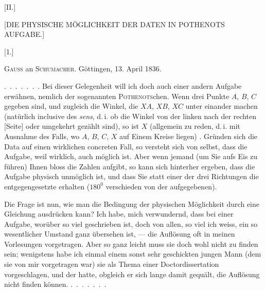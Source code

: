 \clearpage{}

\begin{center}
[II.]

[DIE PHYSISCHE MÖGLICHKEIT DER DATEN IN POTHENOTS AUFGABE.]

[1.]
\end{center}

\begin{center}
\textsc{Gauss} an \textsc{Schumacher}. Göttingen, 13. April 1836.
\end{center}

\indent \mbox{. . . . . . .} Bei dieser Gelegenheit will ich doch auch einer
andern Aufgabe erwähnen, nemlich der sogenannten \textsc{Pothenots}chen.
Wenn drei Punkte $A$, $B$, $C$ gegeben sind, und zugleich die
Winkel, die $XA$, $XB$, $XC$ unter einander machen
(natürlich inclusive des \emph{sens}, d.\,i. ob die Winkel von der linken
nach der rechten [Seite] oder umgekehrt gezählt sind), so ist
$X$ (allgemein zu reden, d.\,i. mit Ausnahme des Falls, wo $A$,
$B$, $C$, $X$ auf Einem Kreise liegen) . Gründen sich die
Data auf einen wirklichen concreten Fall, so versteht sich von selbst,
dass die Aufgabe, weil wirklich, auch möglich ist. Aber wenn jemand (um
Sie aufs Eis zu führen) Ihnen bloss die Zahlen aufgibt, so kann sich
hinterher ergeben, dass die Aufgabe physisch unmöglich ist, und dass Sie
statt einer der drei Richtungen die entgegengesetzte erhalten
($180^0$ verschieden von der aufgegebenen).

Die Frage ist nun, wie man  die Bedingung der physischen
Möglichkeit durch eine Gleichung  ausdrücken kann? Ich
habe, mich verwundernd, dass bei einer Aufgabe, worüber so viel
geschrieben ist, doch von allen, so viel ich weiss, ein so wesentlicher
Umstand ganz übersehen ist, — die Auflösung oft in meinen Vorlesungen
vorgetragen. Aber so ganz leicht muss sie doch wohl nicht zu finden sein;
wenigstens habe ich einmal einem sonst sehr geschickten jungen Mann (dem
sie von mir  vorgetragen war) sie als Thema einer Doctordissertation
vorgeschlagen, und der hatte, obgleich er sich lange damit gequält, die
Auflösung nicht finden können. \mbox{. . . . . . .}

